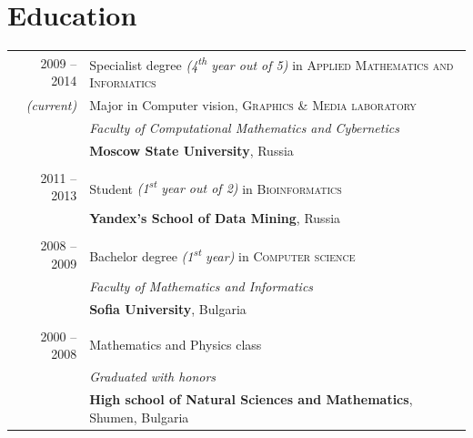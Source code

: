 \documentclass[a4paper,10pt]{article}
\def\myline{\color{linegray}\vline}
\begin{document}
\section{Education}
\hspace{0mm}\begin{tabular}{r!{\myline}p{14cm}}
        \textsc{2009 -- 2014}     &  Specialist degree {\small\textit{(4\textsuperscript{th} year out of 5)}} in \textsc{Applied Mathematics and Informatics}\\
        \small\textit{(current)}  &  Major in Computer vision, \textsc{Graphics \& Media laboratory}\\
                                  &  \textit{Faculty of Computational Mathematics and Cybernetics}\\
                                  &  \textbf{Moscow State University}, Russia\\

        \\
	\textsc{2011 -- 2013}     &  Student {\small\textit{(1\textsuperscript{st} year out of 2)}} in \textsc{Bioinformatics}\\
	                          &  \textbf{Yandex's School of Data Mining}, Russia\\
	

	\\
	\textsc{2008 -- 2009}     &  Bachelor degree {\small\textit{(1\textsuperscript{st} year)}} in \textsc{Computer science}\\
                                  &  \textit{Faculty of Mathematics and Informatics}\\
                                  &  \textbf{Sofia University}, Bulgaria\\
	
	\\
	\textsc{2000 -- 2008}     &  Mathematics and Physics class\\
                                  &  \textit{Graduated with honors}\\ %
                                  &  \textbf{High school of Natural Sciences and Mathematics}, Shumen, Bulgaria\\
\end{tabular}
\par\smallskip
\end{document}
